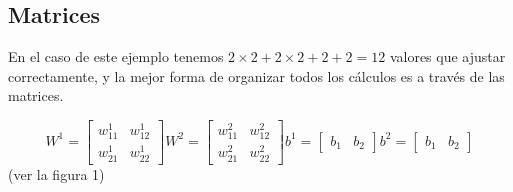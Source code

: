 \documentclass{article}
\begin{document}
	\subsection{Matrices}
	En el caso de este ejemplo tenemos \(2 \times 2 + 2 \times 2 + 2 + 2 = 12 \) valores que ajustar correctamente, y la mejor forma de organizar todos los cálculos es a través de las matrices.

	\[
	W^1 = \begin{bmatrix}
		w^1_{11} & w^1_{12}  \\
		w^1_{21} & w^1_{22}
	\end{bmatrix}
		W^2 = \begin{bmatrix}
		w^2_{11} & w^2_{12}  \\
		w^2_{21} & w^2_{22}
	\end{bmatrix}
	b^1 = \begin{bmatrix}
		b_1 & b_2
	\end{bmatrix}
		b^2 = \begin{bmatrix}
		b_1 & b_2
	\end{bmatrix}
	\]
	(ver la figura 1)
\end{document}
